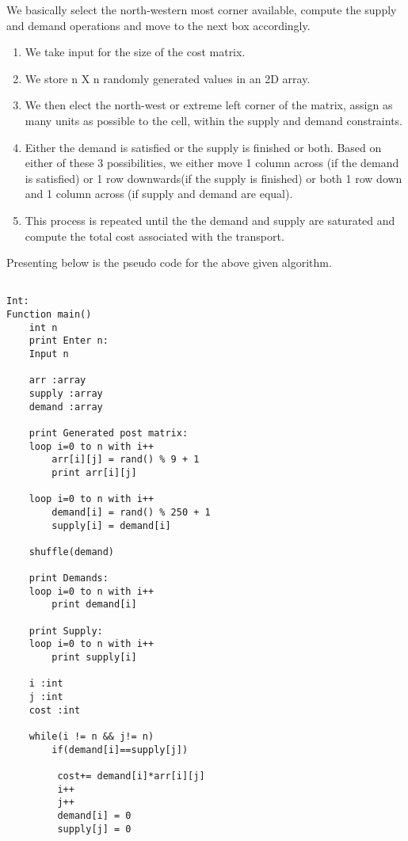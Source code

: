 \documentclass[10pt]{article}
\begin{document}
\begin{multicols*}{2}
We basically select the north-western most corner available, compute the supply and demand operations and move to the next box accordingly.

\begin{enumerate}
\item We take input for the size of the cost matrix.
\item We store n X n randomly generated values in an 2D array.
\item We then elect the north-west or extreme left corner of the matrix, assign as many units as possible to the cell, within the supply and demand constraints. 
\item Either the demand is satisfied or the supply is finished or both. Based on either of these 3 possibilities, we either move 1 column across (if the demand is satisfied) or 1 row downwards(if the supply is finished) or both 1 row down and 1 column across (if supply and demand are equal).
\item This process is repeated until the the demand and supply are saturated and compute the total cost associated with the transport.
\end{enumerate}

Presenting below is the pseudo code for the above given algorithm.


\begin{lstlisting}
    
Int:
Function main()
    int n
    print Enter n:
    Input n
    
    arr :array
    supply :array
    demand :array
    
    print Generated post matrix:
    loop i=0 to n with i++
        arr[i][j] = rand() % 9 + 1
        print arr[i][j]
        
    loop i=0 to n with i++
        demand[i] = rand() % 250 + 1
        supply[i] = demand[i]
    
    shuffle(demand)
    
    print Demands:
    loop i=0 to n with i++
        print demand[i]
        
    print Supply:
    loop i=0 to n with i++
        print supply[i]
    
    i :int
    j :int
    cost :int
    
    while(i != n && j!= n)
        if(demand[i]==supply[j])
        
		 cost+= demand[i]*arr[i][j]
		 i++
		 j++
		 demand[i] = 0
		 supply[j] = 0
		 	

\end{lstlisting}
\end{multicols*}
\end{document}
